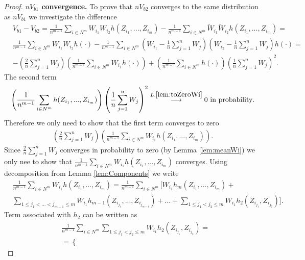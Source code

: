 \begin{proof}
\textbf{$nV_{b1}$ convergence.} To prove that  $nV_{b2}$ converges to the same distribution as $nV_{b1}$ we investigate the difference
\begin{align}
&V_{b1} - V_{b2} = \frac{1} {n^{m-1}} \sum_{i \in N^m} W_{i_1}W_{i_2} h(Z_{i_1},...,Z_{i_m}) - \frac{1} {n^{m-1}} \sum_{i \in N^m} \tilde W_{i_1} \tilde W_{i_2} h(Z_{i_1},...,Z_{i_m}) = \\
&\frac{1} {n^{m-1}} \sum_{i \in N^m} W_{i_1}W_{i_2} h(\cdot) - \frac{1} {n^{m-1}} \sum_{i \in N^m}  (W_{i_1} -\frac 1 n \sum_{j=1}^n W_j ) (W_{i_2} -\frac 1 n \sum_{j=1}^n W_j ) h(\cdot) = \\
&-\left(\frac 2 n \sum_{j=1}^n W_j \right) \left( \frac{1} {n^{m-1}} \sum_{i \in N^{m}} W_{i_1} h(\cdot) \right)  + \left(\frac{1} {n^{m-1}} \sum_{i \in N^{m}}  h(\cdot) \right) \left(\frac 1 n \sum_{j=1}^n W_j \right)^2.
\end{align} 
The second term
\begin{align}
\left(\frac{1} {n^{m-1}} \sum_{i \in N^{m}}  h(Z_{i_1},...,Z_{i_m}) \right) \left(\frac 1 n \sum_{j=1}^n W_j \right)^2 \overset{L. \ref{lem:toZeroWi}}{\longrightarrow} 0 \text{ in probability}.
\end{align}
Therefore we only need to show that the first term converges to zero
\begin{align}
\label{eq:firstTerm}
\left(\frac 2 n \sum_{j=1}^n W_j \right) \left( \frac{1} {n^{m-1}} \sum_{i \in N^{m}} W_{i_1} h(Z_{i_1},...,Z_{i_m}) \right).
\end{align}
Since $\frac 2 n \sum_{j=1}^n W_j$ converges in probability to zero (by Lemma \ref{lem:meanWi}) we only nee to show that $\frac{1} {n^{m-1}} \sum_{i \in N^{m}} W_{i_1} h(Z_{i_1},...,Z_{i_m})$ converges. Using decomposition from Lemma \ref{lem:Components} we write
\begin{align}
\label{eq:xyz}
&\frac{1} {n^{m-1}} \sum_{i \in N^{m}} W_{i_1} h(Z_{i_1},...,Z_{i_m}) =\frac{1} {n^{m-1}}  \sum_{i \in N^m}  \Big[ W_{i_1}    h_m(Z_{i_1},...,Z_{i_m})  + \\ 
 & \sum_{1 \leq j_1 < ...<j_{m-1} \leq m } W_{i_1}  h_{m-1}(Z_{i_{j_1}},...,Z_{i_{j_{m-1}}})   + ... + \sum_{1 \leq j_1 < j_2 \leq m } W_{i_1}  h_2(Z_{i_{j_1}},Z_{i_{j_2}}) \Big].
\end{align}
Term associated with $h_2$ can be written as
\begin{align}
&\frac{1} {n^{m-1}} \sum_{i \in N^{m}} \sum_{1 \leq j_1 < j_2 \leq m } W_{i_1}  h_2(Z_{i_{j_1}},Z_{i_{j_2}}) = \\
&= \left\{
 \begin{array}{lr}

\end{array}
\end{align}
\end{proof}
